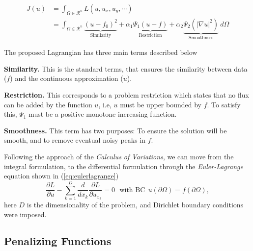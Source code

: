 \documentclass{article}
\begin{document}
\begin{align}
J(u) &= \int_{\Omega \in \mathcal{R}^n} L(u, u_x, u_y, \cdots ) \\
&= \int_{\Omega \in \mathcal{R}^n} \underbrace{(u-f_0)^2}_{\text{Similarity}} + \alpha_1 \underbrace{\Psi_1(u-f)}_{\text{Restriction}} + \alpha_2 \underbrace{\Psi_2(|\nabla u|^2)}_{\text{Smoothness}} \ d\Omega
\label{eq:functional}
\end{align}

The proposed Lagrangian has three main terms described below
\begin{description}
\item \textbf{Similarity.} This is the standard terms, that ensures the similarity between data ($f$) and the continuous approximation ($u$).
\item \textbf{Restriction.} This corresponds to a problem restriction which states that no flux can be added by the function $u$, i.e, $u$ must be upper bounded by $f$. To satisfy this, $\Psi_1$ must be a positive monotone increasing function.
\item \textbf{Smoothness.} This term has two purposes: To ensure the solution will be  smooth, and to remove eventual noisy peaks in $f$.
\end{description}

Following the approach of the \textit{Calculus of Variations}, we can move from the integral formulation, to the differential formulation through the \textit{Euler-Lagrange} equation shown in (\ref{eq:eulerlagrange})
\begin{equation}
\frac{\partial L}{\partial u} - \sum_{k=1}^D \frac{d}{d x_k} \frac{\partial L}{\partial u_{x_k}} = 0 \ \ \ \text{with BC} \ \ u(\partial \Omega) = f(\partial \Omega),
\label{eq:eulerlagrange}
\end{equation}
here $D$ is the dimensionality of the problem, and Dirichlet boundary conditions were imposed.

\subsection{Penalizing Functions}
\end{document}

